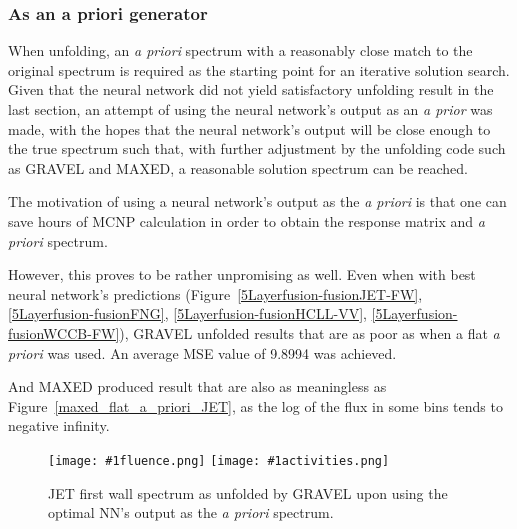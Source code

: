 \documentclass[a4paper, 12pt]{article}
\newcommand{\fluenceandactivities}[1]{
\texttt{[image: \#1fluence.png]}
\texttt{[image: \#1activities.png]}
}
\begin{document}
\subsubsection{As an a priori generator}
When unfolding, an \emph{a priori} spectrum with a reasonably close match to the original spectrum is required as the starting point for an iterative solution search. Given that the neural network did not yield satisfactory unfolding result in the last section, an attempt of using the neural network's output as an \emph{a prior} was made, with the hopes that the neural network's output will be close enough to the true spectrum such that, with further adjustment by the unfolding code such as GRAVEL and MAXED, a reasonable solution spectrum can be reached.

The motivation of using a neural network's output as the \emph{a priori} is that one can save hours of MCNP calculation in order to obtain the response matrix and \emph{a priori} spectrum.

However, this proves to be rather unpromising as well. Even when with best neural network's predictions (Figure~\ref{5Layerfusion-fusionJET-FW}, \ref{5Layerfusion-fusionFNG}, \ref{5Layerfusion-fusionHCLL-VV}, \ref{5Layerfusion-fusionWCCB-FW}), GRAVEL unfolded results that are as poor as when a flat \emph{a priori} was used. An average MSE value of 9.8994 was achieved.

And MAXED produced result that are also as meaningless as Figure~\ref{maxed_flat_a_priori_JET}, as the log of the flux in some bins tends to negative infinity.

\begin{figure}
    \centering
    \fluenceandactivities{/home/ocean/Documents/GitHubDir/unfolding/unfolding/unfoldingsuite/neuralnetwork/realinputEarlyStopping/comparison/real_fusion_test_gravel_nn_a_priori_test_001_}
    \caption{JET first wall spectrum as unfolded by GRAVEL upon using the optimal NN's output as the \emph{a priori} spectrum.}\label{gravel_nn_a_priori_JET}
\end{figure}

\end{document}
